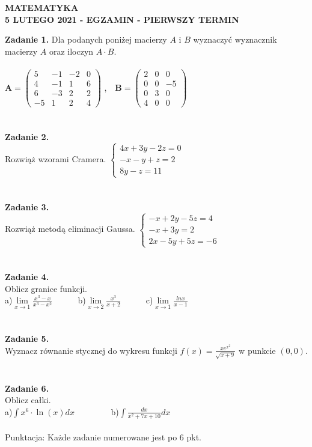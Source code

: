 \documentclass[12pt,a4paper]{report}
\begin{document}
\begin{center}

\textbf{MATEMATYKA \\5 LUTEGO 2021 - EGZAMIN - PIERWSZY TERMIN}

\end{center}\textbf{Zadanie 1.} Dla podanych poniżej macierzy $A$ i $B$ wyznaczyć wyznacznik macierzy $A$ oraz iloczyn $A\cdot B$. \\\\ $\mathbf{A} =\left( \begin{array}{cccc}5 & -1& -2 & 0\\4 & -1&1 & 6\\6 & -3& 2 & 2\\-5 & 1 & 2 & 4 \end{array} \right)$ ,\ \ $\mathbf{B} =\left( \begin{array}{ccc}2 & 0& 0\\0 & 0& -5\\0 & 3& 0\\4 & 0& 0\end{array} \right)$\\\\\\\textbf{Zadanie 2.} \\Rozwiąż wzorami Cramera. $\left\{ \begin{array}{ll}4x+3y-2z=0\\-x-y+z=2\\8y-z=11\end{array} \right.$\\\\\\\textbf{Zadanie 3.}  \\Rozwiąż metodą eliminacji Gaussa. $\left\{ \begin{array}{ll}-x+2y-5z=4\\-x+3y=2\\2x-5y+5z=-6\end{array} \right.$\\\\\\\textbf{Zadanie 4.}\\Oblicz granice funkcji.\\a)$\lim\limits_{x\to 1}\frac{x^3-x}{x^3-x^2}$\ \ \ \ \ \  b)$\lim\limits_{x\to 2}\frac{x^3}{x+2}$\ \ \ \ \ \ c)$\lim\limits_{x\to 1} \frac{lnx}{x-1}$\\\\\\\textbf{Zadanie 5.} \\Wyznacz równanie stycznej do wykresu funkcji $f(x)=\frac{xe^{x^2}}{\sqrt{x+9}}$ w punkcie $(0,0)$.\\\\\\\textbf{Zadanie 6.}\\Oblicz całki. \\a)$\int x^6\cdot \ln(x) dx$ \ \ \ \ \ \ \ \ b)$\int \frac{dx}{x^2+7x+10} dx$\\\\Punktacja: Każde zadanie numerowane jest po 6 pkt.
\end{document}

